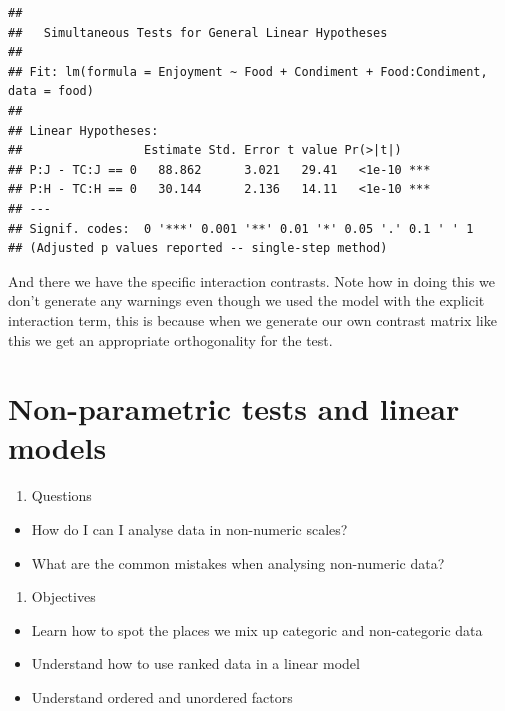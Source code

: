 \documentclass[
]{book}
\providecommand{\tightlist}{%
  \setlength{\itemsep}{0pt}\setlength{\parskip}{0pt}}
\begin{document}
\begin{verbatim}
## 
## 	 Simultaneous Tests for General Linear Hypotheses
## 
## Fit: lm(formula = Enjoyment ~ Food + Condiment + Food:Condiment, data = food)
## 
## Linear Hypotheses:
##                 Estimate Std. Error t value Pr(>|t|)    
## P:J - TC:J == 0   88.862      3.021   29.41   <1e-10 ***
## P:H - TC:H == 0   30.144      2.136   14.11   <1e-10 ***
## ---
## Signif. codes:  0 '***' 0.001 '**' 0.01 '*' 0.05 '.' 0.1 ' ' 1
## (Adjusted p values reported -- single-step method)
\end{verbatim}

And there we have the specific interaction contrasts. Note how in doing this we don't generate any warnings even though we used the model with the explicit interaction term, this is because when we generate our own contrast matrix like this we get an appropriate orthogonality for the test.

\hypertarget{non-parametric-tests-and-linear-models}{%
\chapter{Non-parametric tests and linear models}\label{non-parametric-tests-and-linear-models}}

\begin{enumerate}
\def\labelenumi{\arabic{enumi}.}
\tightlist
\item
  Questions
\end{enumerate}

\begin{itemize}
\tightlist
\item
  How do I can I analyse data in non-numeric scales?
\item
  What are the common mistakes when analysing non-numeric data?
\end{itemize}

\begin{enumerate}
\def\labelenumi{\arabic{enumi}.}
\setcounter{enumi}{1}
\tightlist
\item
  Objectives
\end{enumerate}

\begin{itemize}
\tightlist
\item
  Learn how to spot the places we mix up categoric and non-categoric data
\item
  Understand how to use ranked data in a linear model
\item
  Understand ordered and unordered factors
\end{itemize}
\end{document}
